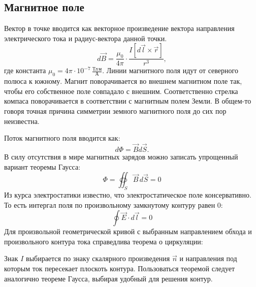 \subsection{Магнитное поле}

 Вектор  в точке вводится как векторное произведение вектора направления электрического тока и радиус-вектора данной точки. 
 \begin{equation}
 	d \vec{B} = \frac{\mu_0}{4\pi} \cdot \frac{I[d \vec{l}\times\vec{r}]}{r^3},
 	\label{eq:BSL-law}
 \end{equation}
 где константа $\mu_{0} = 4 \pi \cdot 10^{-7} \, \frac{\text{Тл} \, \text{м}}{\text{А}}$. Линии магнитного поля идут от северного полюса к южному. Магнит поворачивается во внешнем магнитном поле так, чтобы его собственное поле совпадало с внешним. Соответственно стрелка компаса поворачивается в соответствии с магнитным полем Земли. В общем-то говоря точная причина симметрии земного магнитного поля до сих пор неизвестна.

 Поток магнитного поля вводится как:
 \begin{equation}
 	d\Phi = \vec{B}d\vec{S}.
 \end{equation}
 В силу отсутствия в мире магнитных зарядов можно записать упрощенный вариант теоремы Гаусса:
 \begin{equation}
     \Phi = \oiint_{S}{\vec{B} \, d\vec{S}} = 0
 \end{equation}
 Из курса электростатики известно, что электростатическое поле консервативно. То есть интергал поля по произвольному замкнутому контуру равен 0:
 \begin{equation*}
     \oint{\vec{E} \cdot d \vec{l}} = 0
 \end{equation*}
 Для произвольной геометрической кривой с выбранным направлением обхода и произвольного контура тока справедлива теорема о циркуляции:
 \begin{center}
 \end{center}
 Знак $I$ выбирается по знаку скалярного произведения $\Vec{n}$ и направления под которым ток пересекает плоскоть контура. Пользоваться теоремой следует аналогично теореме Гаусса, выбирая удобный для решения контур. 
